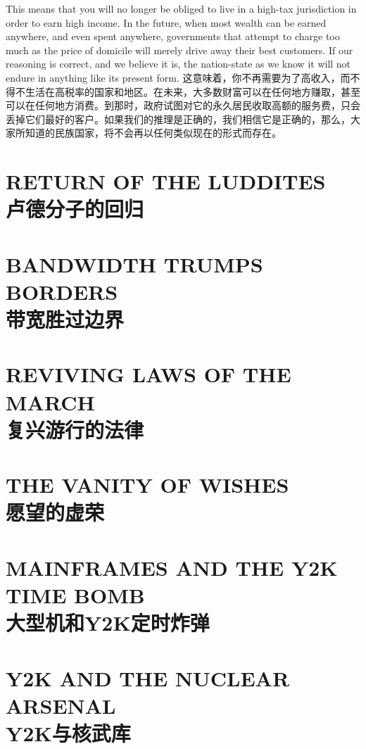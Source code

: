 \begin{paracol}{2}[]
\switchcolumn*
This means that you will no longer be obliged to live in a high-tax jurisdiction in order to earn high income. In the future, when most wealth can be earned anywhere, and even spent anywhere, governments that attempt to charge too much as the price of domicile will merely drive away their best customers. If our reasoning is correct, and we believe it is, the nation-state as we know it will not endure in anything like its present form.
\switchcolumn
这意味着，你不再需要为了高收入，而不得不生活在高税率的国家和地区。在未来，大多数财富可以在任何地方赚取，甚至可以在任何地方消费。到那时，政府试图对它的永久居民收取高额的服务费，只会丢掉它们最好的客户。如果我们的推理是正确的，我们相信它是正确的，那么，大家所知道的民族国家，将不会再以任何类似现在的形式而存在。
\end{paracol}

\section[卢德分子回归]{RETURN OF THE LUDDITES\\卢德分子的回归}


\section[带宽胜过边界]{BANDWIDTH TRUMPS BORDERS\\带宽胜过边界}


\section[复兴游行的法律]{REVIVING LAWS OF THE MARCH\\复兴游行的法律}


\section[愿望的虚荣]{THE VANITY OF WISHES\\愿望的虚荣}


\section[大型机和Y2K定时炸弹]{MAINFRAMES AND THE Y2K TIME BOMB\\大型机和Y2K定时炸弹}


\section[Y2K与核武库]{Y2K AND THE NUCLEAR ARSENAL\\Y2K与核武库}



\begin{paracol}{2}[]
\switchcolumn
\end{paracol}


